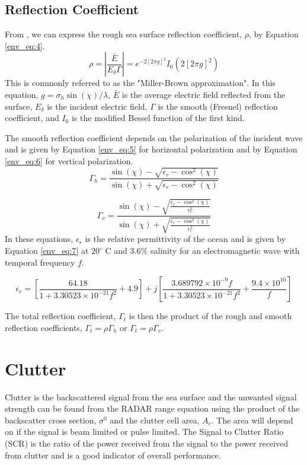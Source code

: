 \subsection{Reflection Coefficient}
From \cite{miller_reflection}, we can express the rough sea surface reflection coefficient, $\rho$, by Equation \ref{env_eq:4}. 
  \begin{equation}
  \label{env_eq:4}
\rho = \left|\frac{\bar{E}}{E_\delta \Gamma} \right| = e^{-2\left[2\pi g \right]^2}I_0\left( 2\left[2\pi g \right]^2\right) 
\end{equation}
This is commonly referred to as the "Miller-Brown approximation". In this equation, $g = \sigma_h\sin(\chi)/\lambda$, $\bar{E}$ is the average electric field reflected from the surface, $E_\delta$ is the incident electric field, $\Gamma$ is the smooth (Fresnel) reflection coefficient, and $I_0$ is the modified Bessel function of the first kind.

The smooth reflection coefficient depends on the polarization of the incident wave and is given by Equation \ref{env_eq:5} for horizontal polarization and by Equation \ref{env_eq:6} for vertical polarization.
  \begin{equation}
  \label{env_eq:5}
 \Gamma_h = \frac{\sin(\chi)- \sqrt{\epsilon_r - \cos^2(\chi)}}{\sin(\chi) + \sqrt{\epsilon_r - \cos^2(\chi)}}
  \end{equation}
  
  \begin{equation}
  \label{env_eq:6}
 \Gamma_v = \frac{\sin(\chi)- \sqrt{\frac{\epsilon_r - \cos^2(\chi)}{\epsilon_r^2}}}{\sin(\chi) + \sqrt{\frac{\epsilon_r - \cos^2(\chi)}{\epsilon_r^2}}}
  \end{equation}
In these equations, $\epsilon_r$ is the relative permittivity of the ocean and is given by Equation \ref{env_eq:7} at $20^{\circ}$ C and $3.6\%$ salinity for an electromagnetic wave with temporal frequency $f$. 
  
\begin{equation}
  \label{env_eq:7}
\epsilon_r = \left[\frac{64.18}{1 + 3.30523\times 10^{-21}f^2} + 4.9 \right] + j\left[\frac{3.689792\times 10^{-9}f}{1 + 3.30523\times 10^{-21}f^2} + \frac{9.4\times 10^{10}}{f} \right]
  \end{equation}
  
The total reflection coefficient, $\Gamma_t$ is then the product of the rough and smooth reflection coefficients, $\Gamma_t = \rho\Gamma_h$ or $\Gamma_t = \rho\Gamma_v$.

\section{Clutter}
Clutter is the backscattered signal from the sea surface and the unwanted signal strength can be found from the RADAR range equation using the product of the backscatter cross section, $\sigma^0$ and the clutter cell area, $A_c$. The area will depend on if the signal is beam limited or pulse limited. The Signal to Clutter Ratio (SCR) is the ratio of the power received from the signal to the power received from clutter and is a good indicator of overall performance.

